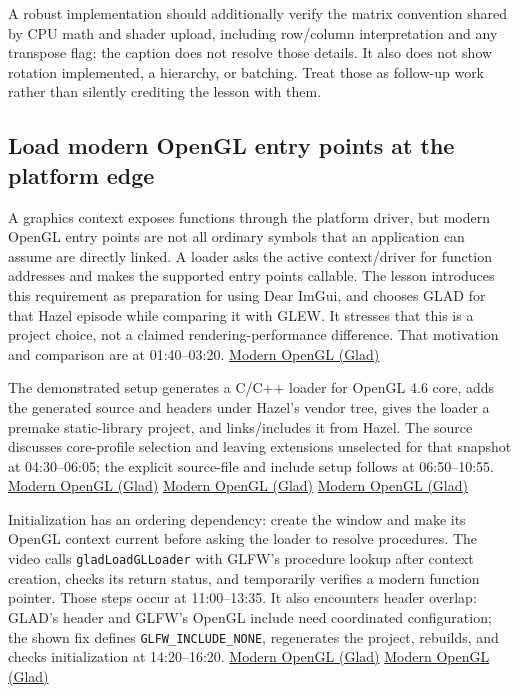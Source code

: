 A robust implementation should additionally verify the matrix convention shared by CPU math and shader upload, including row/column interpretation and any transpose flag; the caption does not resolve those details. It also does not show rotation implemented, a hierarchy, or batching. Treat those as follow-up work rather than silently crediting the lesson with them.

\subsection{Load modern OpenGL entry points at the platform edge}\label{06-engine-ii-ch025-load-modern-opengl-entry-points-at-the-platform-edge}

A graphics context exposes functions through the platform driver, but modern OpenGL entry points are not all ordinary symbols that an application can assume are directly linked. A loader asks the active context/driver for function addresses and makes the supported entry points callable. The lesson introduces this requirement as preparation for using Dear ImGui, and chooses GLAD for that Hazel episode while comparing it with GLEW. It stresses that this is a project choice, not a claimed rendering-performance difference. That motivation and comparison are at 01:40--03:20. \href{https://www.youtube.com/watch?v=HFyHIc89z1g&t=100s}{Modern OpenGL (Glad)}

The demonstrated setup generates a C/C++ loader for OpenGL 4.6 core, adds the generated source and headers under Hazel's vendor tree, gives the loader a premake static-library project, and links/includes it from Hazel. The source discusses core-profile selection and leaving extensions unselected for that snapshot at 04:30--06:05; the explicit source-file and include setup follows at 06:50--10:55. \href{https://www.youtube.com/watch?v=HFyHIc89z1g&t=270s}{Modern OpenGL (Glad)} \href{https://www.youtube.com/watch?v=HFyHIc89z1g&t=410s}{Modern OpenGL (Glad)} \href{https://www.youtube.com/watch?v=HFyHIc89z1g&t=650s}{Modern OpenGL (Glad)}

Initialization has an ordering dependency: create the window and make its OpenGL context current before asking the loader to resolve procedures. The video calls \texttt{gladLoadGLLoader} with GLFW's procedure lookup after context creation, checks its return status, and temporarily verifies a modern function pointer. Those steps occur at 11:00--13:35. It also encounters header overlap: GLAD's header and GLFW's OpenGL include need coordinated configuration; the shown fix defines \texttt{GLFW\_INCLUDE\_NONE}, regenerates the project, rebuilds, and checks initialization at 14:20--16:20. \href{https://www.youtube.com/watch?v=HFyHIc89z1g&t=660s}{Modern OpenGL (Glad)} \href{https://www.youtube.com/watch?v=HFyHIc89z1g&t=860s}{Modern OpenGL (Glad)}

